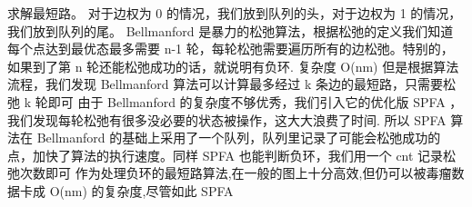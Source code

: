 {}\markdownRendererDollarSign{}求解最短路。\markdownRendererParagraphSeparator
{}对于边权为\markdownRendererDollarSign{} 0 \markdownRendererDollarSign{}的情况，我们放到队列的头，对于边权为\markdownRendererDollarSign{} 1 \markdownRendererDollarSign{}的情况，我们放到队列的尾。\markdownRendererInterblockSeparator
{}
\markdownRendererSectionEnd \markdownRendererSectionBegin
{}\markdownRendererInterblockSeparator
{}\markdownRendererDollarSign{} Bellmanford \markdownRendererDollarSign{}是暴力的松弛算法，根据松弛的定义我们知道每个点达到最优态最多需要\markdownRendererDollarSign{} n-1\markdownRendererSoftLineBreak
{}\markdownRendererDollarSign{}轮，每轮松弛需要遍历所有的边松弛。特别的，如果到了第\markdownRendererDollarSign{} n\markdownRendererSoftLineBreak
{}\markdownRendererDollarSign{}轮还能松弛成功的话，就说明有负环.\markdownRendererParagraphSeparator
{}复杂度\markdownRendererDollarSign{} O(nm) \markdownRendererDollarSign{}\markdownRendererParagraphSeparator
{}但是根据算法流程，我们发现\markdownRendererDollarSign{} Bellmanford\markdownRendererSoftLineBreak
{}\markdownRendererDollarSign{}算法可以计算最多经过\markdownRendererDollarSign{} k \markdownRendererDollarSign{}条边的最短路，只需要松弛\markdownRendererDollarSign{} k\markdownRendererSoftLineBreak
{}\markdownRendererDollarSign{}轮即可\markdownRendererInterblockSeparator
{}\markdownRendererInterblockSeparator
{}
\markdownRendererSectionEnd \markdownRendererSectionBegin
{}\markdownRendererInterblockSeparator
{}由于\markdownRendererDollarSign{} Bellmanford\markdownRendererSoftLineBreak
{}\markdownRendererDollarSign{}的复杂度不够优秀，我们引入它的优化版\markdownRendererDollarSign{} SPFA \markdownRendererDollarSign{}，我们发现每轮松弛有很多没必要的状态被操作，这大大浪费了时间.\markdownRendererParagraphSeparator
{}所以\markdownRendererDollarSign{} SPFA\markdownRendererSoftLineBreak
{}\markdownRendererDollarSign{}算法在\markdownRendererDollarSign{} Bellmanford \markdownRendererDollarSign{}的基础上采用了一个队列，队列里记录了可能会松弛成功的点，加快了算法的执行速度。同样\markdownRendererDollarSign{} SPFA \markdownRendererDollarSign{}也能判断负环，我们用一个\markdownRendererDollarSign{} cnt\markdownRendererSoftLineBreak
{}\markdownRendererDollarSign{}记录松弛次数即可\markdownRendererParagraphSeparator
{}作为处理负环的最短路算法,在一般的图上十分高效,但仍可以被毒瘤数据卡成\markdownRendererDollarSign{} O(nm) \markdownRendererDollarSign{}的复杂度,尽管如此\markdownRendererDollarSign{} SPFA\markdownRendererSoftLineBreak
